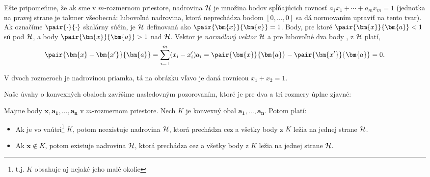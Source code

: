 \begin{shaded}
\begin{minipage}[t]{6cm}
\begin{center}

\end{center}

\end{minipage}\hspace*{1cm}\begin{minipage}[t]{\textwidth-7cm}
  \vspace{0pt}
Ešte pripomeňme, že ak  sme v $m$-rozmernom priestore, nadrovina $\cal H$ je množina bodov  spĺňajúcich
rovnosť $a_1x_1+\cdots+a_mx_m=1$ (jednotka na pravej strane je takmer všeobecná:
ľubovoľná nadrovina, ktorá neprechádza bodom $[0,\ldots,0]$ sa dá normovaním upraviť
na tento tvar). Ak označíme $\pair{\cdot}{\cdot}$ skalárny súčin, je
$\cal H$ definovaná ako $\pair{\bm{x}}{\bm{a}}=1$. 
Body, pre ktoré $\pair{\bm{x}}{\bm{a}}<1$ sú pod $\cal H$, a body
$\pair{\bm{x}}{\bm{a}}>1$ nad $\cal H$.
Vektor  je {\em normálový vektor} $\cal H$ a pre ľubovoľné dva body ,  z $\cal H$ platí,
$$\pair{\bm{x}-\bm{x'}}{\bm{a}}=\sum_{i=1}^m(x_i-x'_i)a_i=\pair{\bm{x}}{\bm{a}}-\pair{\bm{x'}}{\bm{a}}=0.$$

\noindent
V dvoch rozmeroch je nadrovinou priamka, tá na obrázku vľavo je daná rovnicou
$x_1+x_2=1$.

\end{minipage}

\noindent
Naše  úvahy o konvexných obaloch zavŕšime nasledovným pozorovaním, ktoré je
pre dva a tri rozmery úplne zjavné:

\begin{lema}
  \label{lm:KO:2}
  Majme body $\bm{x},\bm{a_1},\ldots,\bm{a_n}$ v $m$-rozmernom priestore. Nech $K$ je konvexný obal
  $\bm{a_1},\ldots,\bm{a_n}$. Potom platí:
  \begin{itemize}
    \item 
      Ak  je vo vnútri\footnote{t.j. $K$ obsahuje  aj nejaké jeho malé okolie} $K$,
      potom neexistuje nadrovina $\cal H$, ktorá prechádza cez  a všetky body z $K$
      ležia na jednej strane $\cal H$.
    \item 
      Ak $\bm{x} \not\in K$,
      potom existuje nadrovina $\cal H$, ktorá prechádza cez  a všetky body z $K$
      ležia na jednej strane $\cal H$.
  \end{itemize}
\end{lema}


\end{shaded}
